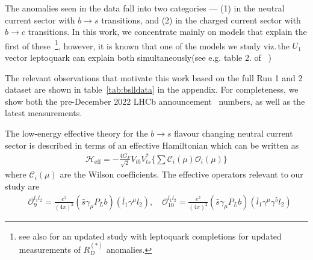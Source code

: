 \documentclass[12pt]{revtex4-2}
\numberwithin{equation}{section}
\begin{document}
The anomalies seen in the data fall into two categories --- (1) in the neutral current sector with $b \rightarrow s$ transitions, and (2) in the charged current sector with $b \rightarrow c$ transitions.  In this work, we concentrate mainly on models that explain the first of these~\footnote{see also \cite{Iguro:2022yzr} for an updated study with leptoquark completions for updated measurements of $R_D^{(*)}$ anomalies.}, however, it is known that one of the models we study viz.\,the $U_1$ vector leptoquark can explain both simultaneously(see e.g. table 2. of ~\cite{Angelescu:2018tyl})

The relevant observations that motivate this work based on the full Run 1 and 2 dataset are shown in table~\ref{tab:bslldata} in the appendix.  For completeness, we show both the pre-December 2022 LHCb announcement~\cite{LHCb:2022qnv,LHCb:2022zom} numbers, as well as the latest measurements.   



\noindent The low-energy effective theory for the  $b \rightarrow s$ flavour changing neutral current sector is described in terms of an effective Hamiltonian which can be written as
\begin{align}\nonumber
    \mathcal{H}_{\text{eff}} = -\frac{4G_{F}}{\sqrt{2}} V_{tb} V^{*}_{ts}\bigg\{\sum \mathcal{C}_{i}(\mu)\mathcal{O}_{i}(\mu ) \bigg\}
\end{align}
where $\mathcal{C}_{i}(\mu)$ are the Wilson coefficients. The effective operators relevant to our study are 
\begin{align}
    &\mathcal{O}_{9}^{l_{1}l_{2}} = \frac{e^{2}}{(4\pi)^{2}}(\bar{s}\gamma_{\mu}P_{L}b)(\bar{l}_{1}\gamma^{\mu}l_{2}), \quad
    \mathcal{O}_{10}^{l_{1}l_{2}}=
    \frac{e^{2}}{(4\pi)^{2}}(\bar{s}\gamma_{\mu}P_{L}b)(\bar{l}_{1}\gamma^{\mu}\gamma^{5}l_{2})
\end{align}
\end{document}
